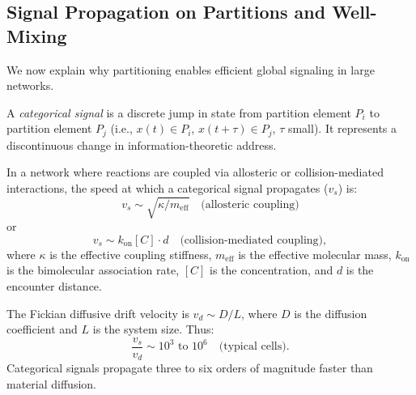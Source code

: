 \subsection{Signal Propagation on Partitions and Well-Mixing}
\label{subsec:signal-propagation}

We now explain why partitioning enables efficient global signaling in large networks.

\begin{definition}
\label{def:categorical-signal}
A \emph{categorical signal} is a discrete jump in state from partition element $P_i$ to partition element $P_j$ (i.e., $x(t) \in P_i$, $x(t+\tau) \in P_j$, $\tau$ small). It represents a discontinuous change in information-theoretic address.
\end{definition}

\begin{theorem}
\label{thm:signal-velocity}
In a network where reactions are coupled via allosteric or collision-mediated interactions, the speed at which a categorical signal propagates ($v_s$) is:
\begin{equation}
  v_s \sim \sqrt{\kappa/m_{\text{eff}}} \quad \text{(allosteric coupling)}
\end{equation}
or
\begin{equation}
  v_s \sim k_{\text{on}}[C] \cdot d \quad \text{(collision-mediated coupling)},
\end{equation}
where $\kappa$ is the effective coupling stiffness, $m_{\text{eff}}$ is the effective molecular mass, $k_{\text{on}}$ is the bimolecular association rate, $[C]$ is the concentration, and $d$ is the encounter distance.

The Fickian diffusive drift velocity is $v_d \sim D/L$, where $D$ is the diffusion coefficient and $L$ is the system size. Thus:
\begin{equation}
  \frac{v_s}{v_d} \sim 10^3 \text{ to } 10^6 \quad \text{(typical cells)}.
\end{equation}
Categorical signals propagate three to six orders of magnitude faster than material diffusion.
\end{theorem}

